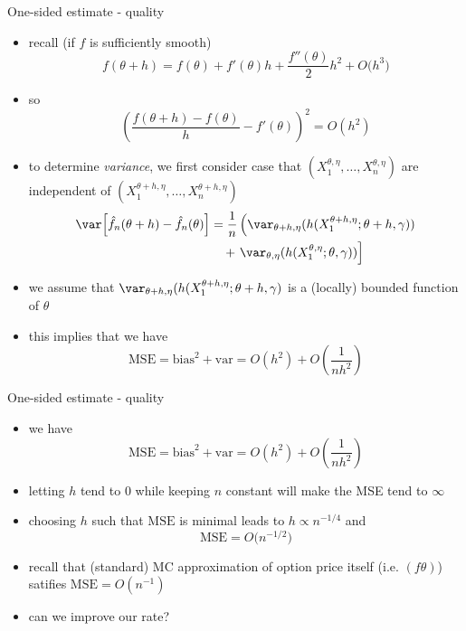 \documentclass[pdf, handout]{beamer}
\begin{document}
\begin{frame}{One-sided estimate - quality}
\begin{itemize}
\item recall (if $f$ is sufficiently smooth)
\[
f(\theta+h) = f(\theta) + f'(\theta)h+\frac{f''(\theta)}{2}h^2 +O\big(h^3\big)
\]
\item so 
\[
\left( \frac{f(\theta+h)-f(\theta)}{h} 
-f'(\theta) \right)^2 = O(h^2)
\]
\item to determine  \emph{variance}, we first consider case  that
$(X_1^{\theta,\eta},\dots,X_n^{\theta,\eta})$ are independent of
$(X_1^{\theta+h,\eta},\dots,X_n^{\theta+h,\eta})$
\begin{align*}
 \var\!\left[
  \hat f_n(\theta+h) -  \hat f_n(\theta)
\right]
 &= \frac{1}{n} \left( \var_{\theta+h,\eta}(   
h(X_1^{\theta+h,\eta};\theta+h,\gamma))
 \right. \\
&\quad +\left.\var_{\theta,\eta}(   
h(X_1^{\theta,\eta};\theta,\gamma))\right]
\end{align*}
\item we assume that $ \var_{\theta+h,\eta}(   
h(X_1^{\theta+h,\eta};\theta+h,\gamma)$ is a (locally) bounded function of $\theta$
\item this implies that we have
\[
\text{MSE}  = \text{bias}^2 + \text{var} =O(h^2)  +  O\left(\frac{1}{nh^2}\right)
\]
\end{itemize}
\end{frame}

\begin{frame}{One-sided estimate - quality}
\begin{itemize}
\item we have
\[
\text{MSE}  = \text{bias}^2 + \text{var} = O( h^2)  + O\left( \frac{1}{nh^2} \right)
\]
\item letting $h$ tend to $0$ while keeping $n$ constant will make the MSE
tend to $\infty$
\item choosing $h$ such that $\text{MSE}$ is minimal 
leads to $h \propto n^{-1/4}$ and
$$
\text{MSE} = O\big(n^{-1/2}\big)
$$
\item recall that (standard) MC approximation of option price itself (i.e. $(f\theta)$) satifies
$\text{MSE} = O(n^{-1})$
\item can we improve our rate?
\end{itemize}
\end{frame}
\end{document}
